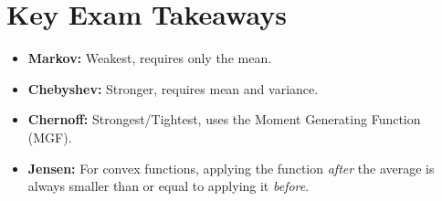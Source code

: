 \documentclass[11pt]{article}
\begin{document}
\section*{Key Exam Takeaways}
\begin{itemize}
    \item \textbf{Markov:} Weakest, requires only the mean.
    \item \textbf{Chebyshev:} Stronger, requires mean and variance.
    \item \textbf{Chernoff:} Strongest/Tightest, uses the Moment Generating Function (MGF).
    \item \textbf{Jensen:} For convex functions, applying the function \textit{after} the average is always smaller than or equal to applying it \textit{before}.
\end{itemize}
\end{document}
